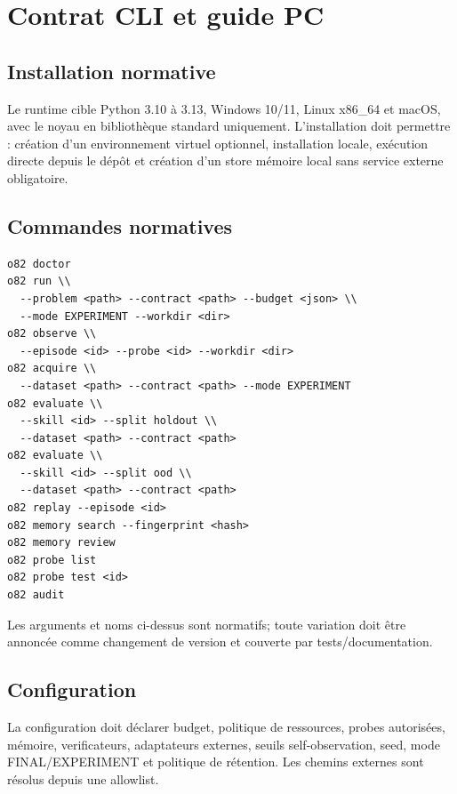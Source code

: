 \documentclass[11pt,a4paper]{report}
\begin{document}
\chapter{Contrat CLI et guide PC}
\section{Installation normative}
Le runtime cible Python 3.10 à 3.13, Windows 10/11, Linux x86\_64 et macOS, avec le noyau en bibliothèque standard uniquement. L'installation doit permettre : création d'un environnement virtuel optionnel, installation locale, exécution directe depuis le dépôt et création d'un store mémoire local sans service externe obligatoire.

\section{Commandes normatives}
\begin{verbatim}
o82 doctor
o82 run \\
  --problem <path> --contract <path> --budget <json> \\
  --mode EXPERIMENT --workdir <dir>
o82 observe \\
  --episode <id> --probe <id> --workdir <dir>
o82 acquire \\
  --dataset <path> --contract <path> --mode EXPERIMENT
o82 evaluate \\
  --skill <id> --split holdout \\
  --dataset <path> --contract <path>
o82 evaluate \\
  --skill <id> --split ood \\
  --dataset <path> --contract <path>
o82 replay --episode <id>
o82 memory search --fingerprint <hash>
o82 memory review
o82 probe list
o82 probe test <id>
o82 audit\end{verbatim}
Les arguments et noms ci-dessus sont normatifs; toute variation doit être annoncée comme changement de version et couverte par tests/documentation.

\section{Configuration}
La configuration doit déclarer budget, politique de ressources, probes autorisées, mémoire, verificateurs, adaptateurs externes, seuils self-observation, seed, mode FINAL/EXPERIMENT et politique de rétention. Les chemins externes sont résolus depuis une allowlist.
\end{document}

